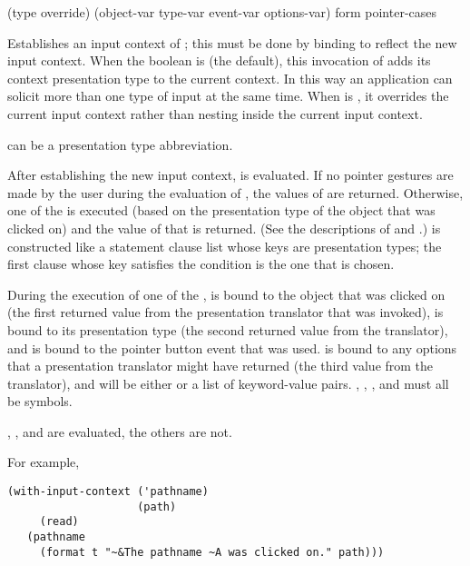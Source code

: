 {(type \key override)
                                (\optional object-var type-var event-var options-var)
                                form
                                \body pointer-cases}

Establishes an input context of  ; this must
be done by binding  to reflect the new input context.  When
the boolean  is  (the default), this invocation of
 adds its context presentation type to the current
context.  In this way an application can solicit more than one type of input at
the same time.  When  is , it overrides the current
input context rather than nesting inside the current input context.

 can be a presentation type abbreviation.

After establishing the new input context,  is evaluated.  If no
pointer gestures are made by the user during the evaluation of , the
values of  are returned.  Otherwise, one of the  is
executed (based on the presentation type of the object that was clicked on) and
the value of that is returned.  (See the descriptions of
 and .)
 is constructed like a  statement clause list whose
keys are presentation types; the first clause whose key satisfies the condition
 is the one that is chosen.

During the execution of one of the ,  is
bound to the object that was clicked on (the first returned value from the
presentation translator that was invoked),  is bound to its
presentation type (the second returned value from the translator), and
 is bound to the pointer button event that was used.
 is bound to any options that a presentation translator might
have returned (the third value from the translator), and will be either 
or a list of keyword-value pairs.  , ,
, and  must all be symbols.

, , and  are evaluated, the others are not.

For example,
\begin{verbatim}
(with-input-context ('pathname)
                    (path)
     (read)
   (pathname
     (format t "~&The pathname ~A was clicked on." path)))
\end{verbatim}


